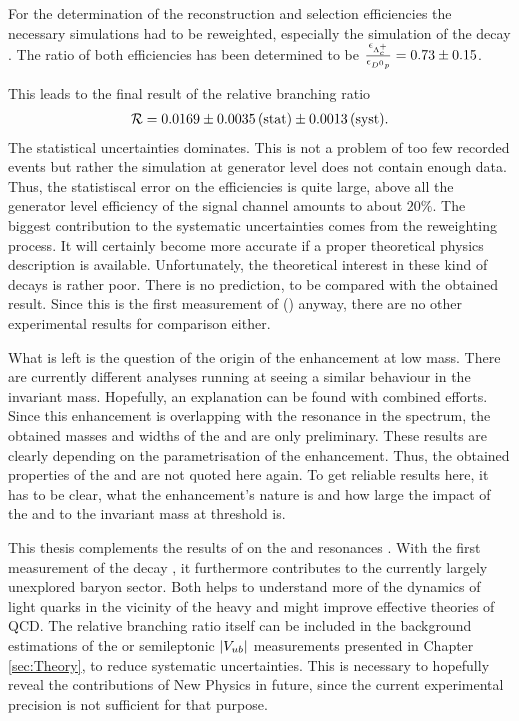 For the determination of the reconstruction and selection efficiencies the necessary simulations had to be reweighted, especially the simulation of the decay \LbToDpmunuX.
The ratio of both efficiencies has been determined to be $\frac{\epsilon_{{{\Lambda}^+_{c}}}}{\epsilon_{{{D}^0}{p}}} = 0.73 \pm 0.15$.

This leads to the final result of the relative branching ratio
\begin{align*}
    \mathcal{R} = 0.0169 \pm 0.0035\mathrm{\,(stat)} \pm 0.0013\mathrm{\,(syst)}.
\end{align*}
The statistical uncertainties dominates.
This is not a problem of too few recorded events but rather the \LbToDpmunuX simulation at generator level does not contain enough data.
Thus, the statistiscal error on the efficiencies is quite large, above all the generator level efficiency \effGenDp of the \LbToDpmunuX signal channel amounts to about $20\%$.
The biggest contribution to the systematic uncertainties comes from the reweighting process.
It will certainly become more accurate if a proper theoretical physics description is available.
Unfortunately, the theoretical interest in these kind of decays is rather poor.
There is no prediction, to be compared with the obtained result.
Since this is the first measurement of \BR(\LbToDpmunuX) anyway, there are no other experimental results for comparison either.

What is left is the question of the origin of the enhancement at low \Dz\proton mass.
There are currently different analyses running at \lhcb seeing a similar behaviour in the invariant \Dz\proton mass.
Hopefully, an explanation can be found with combined efforts.
Since this enhancement is overlapping with the \LcResI resonance in the \Dz\proton spectrum, the obtained masses and widths of the \LcResI and \LcResII are only preliminary.
These results are clearly depending on the parametrisation of the enhancement.
Thus, the obtained properties of the \LcResI and \LcResII are not quoted here again.
To get reliable results here, it has to be clear, what the enhancement's nature is and how large the impact of the  and  to the invariant \Dz\proton mass at threshold is.

This thesis complements the results of \babar on the \LcResI and \LcResII resonances \cite{BaBar_D0p}.
With the first measurement of the decay \LbToDpmunuX, it furthermore contributes to the currently largely unexplored \bquark baryon sector.
Both helps to understand more of the dynamics of light quarks in the vicinity of the heavy \bquark and might improve effective theories of QCD.
The relative branching ratio \R itself can be included in the background estimations of the \asld or semileptonic $|{V_{{u}{b}}}|$ measurements presented in Chapter \ref{sec:Theory}, to reduce systematic uncertainties.
This is necessary to hopefully reveal the contributions of New Physics in future, since the current experimental precision is not sufficient for that purpose.
